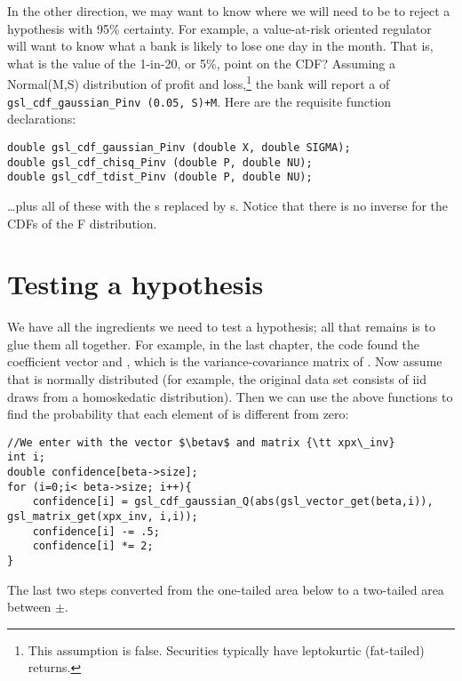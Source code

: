In the other direction, we may want to know where we will need to be to reject a hypothesis with 95\%
certainty. For example, a value-at-risk oriented regulator will want to know what a bank is likely to lose 
one day in the month. That is, what is the value of the 1-in-20, or 5\%, point on the CDF?
Assuming a Normal(M,S) distribution of profit and loss,\footnote{This assumption is false. Securities
typically have leptokurtic (fat-tailed) returns.} the bank will report a  of {\tt
gsl\_cdf\_gaussian\_Pinv (0.05, S)+M}. Here are the requisite function declarations:
\begin{lstlisting}
double gsl_cdf_gaussian_Pinv (double X, double SIGMA);
double gsl_cdf_chisq_Pinv (double P, double NU);
double gsl_cdf_tdist_Pinv (double P, double NU);
\end{lstlisting}
\dots plus all of these with the s replaced by s.
Notice that there is no inverse for the CDFs of the F distribution.





\section{Testing a hypothesis}




We have all the ingredients we need to test a hypothesis; all that
remains is to glue them all together. For example, in the last chapter, the code
found the coefficient vector  and , which is the
variance-covariance matrix of .  Now assume that 
is normally distributed (for example, the original data set consists
of iid draws from a homoskedatic distribution). Then we can use the
above functions to find the probability that each element of 
is different from zero:

\lstset{texcl=true}
\begin{lstlisting}
//We enter with the vector $\betav$ and matrix {\tt xpx\_inv}
int i;
double confidence[beta->size];
for (i=0;i< beta->size; i++){
    confidence[i] = gsl_cdf_gaussian_Q(abs(gsl_vector_get(beta,i)), gsl_matrix_get(xpx_inv, i,i));
    confidence[i] -= .5;
    confidence[i] *= 2;
}
\end{lstlisting}
\lstset{texcl=false}
The last two steps converted from the one-tailed area below 
to a two-tailed area between $\pm$.


